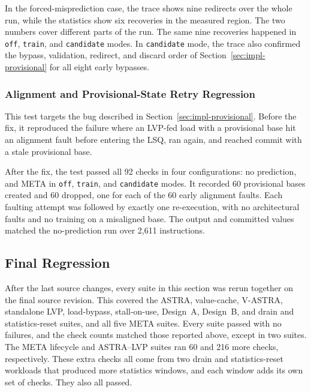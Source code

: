 In the forced-misprediction case, the trace shows nine redirects over
the whole run, while the statistics show six recoveries in the
measured region. The two numbers cover different parts of the run.
The same nine recoveries happened in \texttt{off}, \texttt{train}, and
\texttt{candidate} modes. In \texttt{candidate} mode, the trace also
confirmed the bypass, validation, redirect, and discard order of
Section~\ref{sec:impl-provisional} for all eight early bypasses.

\subsubsection{Alignment and Provisional-State Retry Regression}
\label{subsubsec:meta-alignment-retry}

This test targets the bug described in
Section~\ref{sec:impl-provisional}. Before the fix, it reproduced the
failure where an LVP-fed load with a provisional base hit an alignment
fault before entering the LSQ, ran again, and reached commit with a
stale provisional base.

After the fix, the test passed all 92 checks in four configurations:
no prediction, and META in \texttt{off}, \texttt{train}, and
\texttt{candidate} modes. It recorded 60 provisional bases created and
60 dropped, one for each of the 60 early alignment faults. Each
faulting attempt was followed by exactly one re-execution, with no
architectural faults and no training on a misaligned base. The output
and committed values matched the no-prediction run over 2,611
instructions.

\subsection{Final Regression}
\label{subsec:final-regression}

After the last source changes, every suite in this section was rerun
together on the final source revision. This covered the ASTRA,
value-cache, V-ASTRA, standalone LVP, load-bypass, stall-on-use,
Design~A, Design~B, and drain and statistics-reset suites, and all
five META suites. Every suite passed with no failures, and the check
counts matched those reported above, except in two suites. The META
lifecycle and ASTRA--LVP suites ran 60 and 216 more checks,
respectively. These extra checks all come from two drain and
statistics-reset workloads that produced more statistics windows, and
each window adds its own set of checks. They also all passed.
